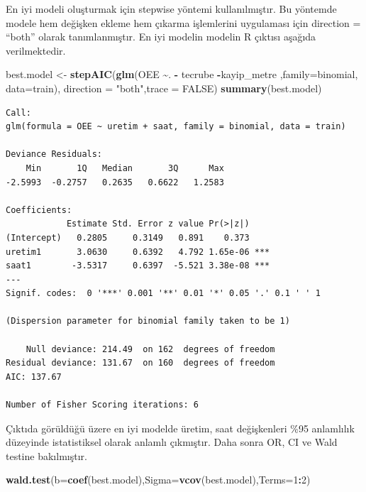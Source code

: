 \documentclass[12pt,twoside]{deuthesis}
\newenvironment{Shaded}{\begin{snugshade}}{\end{snugshade}}
\newcommand{\DataTypeTok}[1]{\textcolor[rgb]{0.13,0.29,0.53}{#1}}
\newcommand{\DecValTok}[1]{\textcolor[rgb]{0.00,0.00,0.81}{#1}}
\newcommand{\KeywordTok}[1]{\textcolor[rgb]{0.13,0.29,0.53}{\textbf{#1}}}
\newcommand{\NormalTok}[1]{#1}
\newcommand{\OperatorTok}[1]{\textcolor[rgb]{0.81,0.36,0.00}{\textbf{#1}}}
\newcommand{\OtherTok}[1]{\textcolor[rgb]{0.56,0.35,0.01}{#1}}
\newcommand{\StringTok}[1]{\textcolor[rgb]{0.31,0.60,0.02}{#1}}
\begin{document}
En iyi modeli oluşturmak için stepwise yöntemi kullanılmıştır. Bu yöntemde modele hem değişken ekleme hem çıkarma işlemlerini uygulaması için direction = ``both'' olarak tanımlanmıştır. En iyi modelin modelin R çıktısı aşağıda verilmektedir.
\begin{Shaded}
\begin{Highlighting}[]
\NormalTok{best.model \textless{}{-}}\StringTok{ }\KeywordTok{stepAIC}\NormalTok{(}\KeywordTok{glm}\NormalTok{(OEE }\OperatorTok{\textasciitilde{}}\NormalTok{. }\OperatorTok{{-}}\StringTok{ }\NormalTok{tecrube }\OperatorTok{{-}}\NormalTok{kayip\_metre ,}\DataTypeTok{family=}\NormalTok{binomial, }\DataTypeTok{data=}\NormalTok{train), }\DataTypeTok{direction =} \StringTok{"both"}\NormalTok{,}\DataTypeTok{trace =} \OtherTok{FALSE}\NormalTok{)}
\KeywordTok{summary}\NormalTok{(best.model)}
\end{Highlighting}
\end{Shaded}
\begin{verbatim}
Call:
glm(formula = OEE ~ uretim + saat, family = binomial, data = train)

Deviance Residuals: 
    Min       1Q   Median       3Q      Max  
-2.5993  -0.2757   0.2635   0.6622   1.2583  

Coefficients:
            Estimate Std. Error z value Pr(>|z|)    
(Intercept)   0.2805     0.3149   0.891    0.373    
uretim1       3.0630     0.6392   4.792 1.65e-06 ***
saat1        -3.5317     0.6397  -5.521 3.38e-08 ***
---
Signif. codes:  0 '***' 0.001 '**' 0.01 '*' 0.05 '.' 0.1 ' ' 1

(Dispersion parameter for binomial family taken to be 1)

    Null deviance: 214.49  on 162  degrees of freedom
Residual deviance: 131.67  on 160  degrees of freedom
AIC: 137.67

Number of Fisher Scoring iterations: 6
\end{verbatim}
Çıktıda görüldüğü üzere en iyi modelde üretim, saat değişkenleri \%95 anlamlılık düzeyinde istatistiksel olarak anlamlı çıkmıştır. Daha sonra OR, CI ve Wald testine bakılmıştır.
\begin{Shaded}
\begin{Highlighting}[]
\KeywordTok{wald.test}\NormalTok{(}\DataTypeTok{b=}\KeywordTok{coef}\NormalTok{(best.model),}\DataTypeTok{Sigma=}\KeywordTok{vcov}\NormalTok{(best.model),}\DataTypeTok{Terms=}\DecValTok{1}\OperatorTok{:}\DecValTok{2}\NormalTok{)}
\end{Highlighting}
\end{Shaded}
\end{document}
